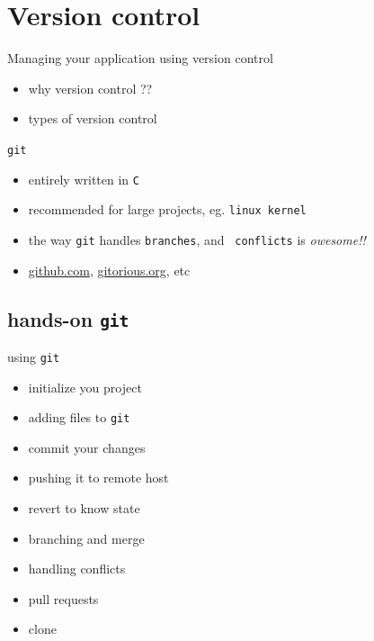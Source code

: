 \documentclass{beamer}
\begin{document}

 \section{Version control}
 \begin{frame}{Managing your application using version control}
   \begin{itemize}
   \item why version control ??
   \item types of version control 
   \end{itemize}

   \begin{block}{{\tt git}}
     \begin{itemize}
     \item entirely written in {\tt C}
     \item recommended for large projects, eg. {\tt linux kernel}
     \item the way {\tt git} handles {\tt branches}, and {\tt
       conflicts} is {\em owesome!!}
     \item {\url{github.com}}, {\url{gitorious.org}}, etc
     \end{itemize}
   \end{block}
 \end{frame}

 \subsection{hands-on {\tt git}}
 \begin{frame}{using {\tt git}}
     \begin{itemize} \pause
     \item initialize you project \pause
     \item adding files to {\tt git} \pause
     \item commit your changes \pause
     \item pushing it to remote host \pause
     \item revert to know state \pause
     \item branching and merge \pause
     \item handling conflicts \pause
     \item pull requests \pause
     \item clone 
     \end{itemize}
 \end{frame}
\end{document}
